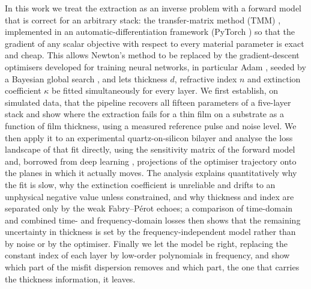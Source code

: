 \documentclass{optica-article}
\newcommand{\kap}{\kappa}
\begin{document}
In this work we treat the extraction as an inverse problem \cite{Tarantola2005,Aster2018} with a forward model that is correct for an arbitrary stack: the transfer-matrix method (TMM) \cite{BornWolf1999,Yeh1988}, implemented in an automatic-differentiation framework (PyTorch \cite{Paszke2019,Baydin2018}) so that the gradient of any scalar objective with respect to every material parameter is exact and cheap. This allows Newton's method to be replaced by the gradient-descent optimisers developed for training neural networks, in particular Adam \cite{Kingma2017}, seeded by a Bayesian global search \cite{Mockus1978,Snoek2012,Shahriari2016,Greenall2017,Peretti2019}, and lets thickness $d$, refractive index $n$ and extinction coefficient $\kap$ be fitted simultaneously for every layer. We first establish, on simulated data, that the pipeline recovers all fifteen parameters of a five-layer stack and show where the extraction fails for a thin film on a substrate as a function of film thickness, using a measured reference pulse and noise level. We then apply it to an experimental quartz-on-silicon bilayer and analyse the loss landscape of that fit directly, using the sensitivity matrix of the forward model and, borrowed from deep learning \cite{Li2018}, projections of the optimiser trajectory onto the planes in which it actually moves. The analysis explains quantitatively why the fit is slow, why the extinction coefficient is unreliable and drifts to an unphysical negative value unless constrained, and why thickness and index are separated only by the weak Fabry--P\'erot echoes; a comparison of time-domain and combined time- and frequency-domain losses then shows that the remaining uncertainty in thickness is set by the frequency-independent model rather than by noise or by the optimiser. Finally we let the model be right, replacing the constant index of each layer by low-order polynomials in frequency, and show which part of the misfit dispersion removes and which part, the one that carries the thickness information, it leaves.

\end{document}
